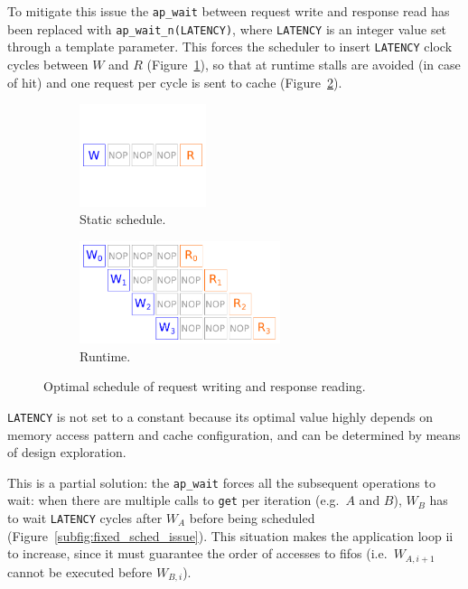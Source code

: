 \documentclass[11pt,a4paper,oneside]{memoir}
\begin{document}
\bigskip
To mitigate this issue the \texttt{ap\_wait} between request write and response
read has been replaced with \texttt{ap\_wait\_n(LATENCY)}, where
\texttt{LATENCY} is an integer value set through a template parameter.
This forces the scheduler to insert \texttt{LATENCY} clock cycles between $W$
and $R$ (Figure~\ref{subfig:desired_sched_static}), so that at runtime stalls
are avoided (in case of hit) and one request per cycle is sent to cache
(Figure~\ref{subfig:desired_sched_run}).

\begin{figure}[!htb]
	\centering
	\begin{subfigure}[b]{.3\textwidth}
		\centering
		\includegraphics[height=3cm]{desired_schedule_static}
		\caption{Static schedule.}
		\label{subfig:desired_sched_static}
	\end{subfigure}
	\hfill
	\begin{subfigure}[b]{.68\textwidth}
		\centering
		\includegraphics[height=3cm]{desired_schedule_run}
		\caption{Runtime.}
		\label{subfig:desired_sched_run}
	\end{subfigure}
	\caption{Optimal schedule of request writing and response reading.}
	\label{fig:desired_sched}
\end{figure}

\texttt{LATENCY} is not set to a constant because its optimal value highly
depends on memory access pattern and cache configuration, and can be determined
by means of design exploration.

This is a partial solution: the \texttt{ap\_wait} forces all the subsequent
operations to wait: when there are multiple calls to \texttt{get} per
iteration (e.g.\ $A$ and $B$), $W_B$ has to wait \texttt{LATENCY} cycles after
$W_A$ before being scheduled (Figure~\ref{subfig:fixed_sched_issue}).
This situation makes the application loop \ac{ii} to increase, since it must
guarantee the order of accesses to \acp{fifo} (i.e.\ $W_{A, i+1}$ cannot be
executed before $W_{B, i}$).
\end{document}
